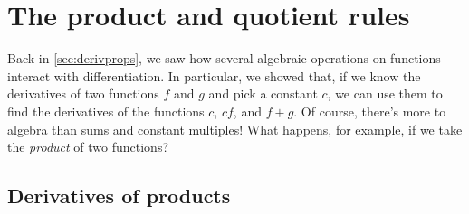 \documentclass[../book/calcnotes.tex]{subfiles}
\begin{document}
\section{The product  and quotient rules}
\label{sec:deriv.prodquot}

Back in \cref{sec:derivprops}, we saw how several algebraic operations on functions interact with differentiation.
In particular, we showed that, if we know the derivatives of two functions $f$ and $g$ and pick a constant $c$, we can use them to find the derivatives of the functions $c$, $cf$, and $f+g$.
Of course, there's more to algebra than sums and constant multiples!
What happens, for example, if we take the \emph{product} of two functions?


\subsection{Derivatives of products}
\label{sec:productrule}
\end{document}
